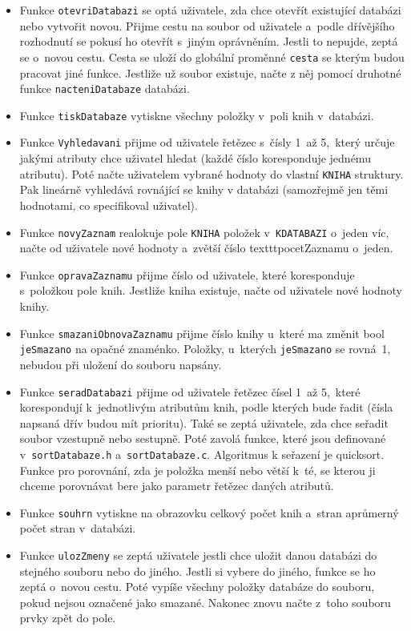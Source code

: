 \begin{itemize}
  \item Funkce \texttt{otevriDatabazi} se optá uživatele, zda chce otevřít existující databázi nebo vytvořit novou. 
  Přijme cestu na soubor od uživatele a~podle dřívějšího rozhodnutí se pokusí ho otevřít s~jiným oprávněním. Jestli 
  to nepujde, zeptá se o~novou cestu. Cesta se uloží do globální proměnné \texttt{cesta} se kterým budou pracovat jiné 
  funkce. Jestliže už soubor existuje, načte z něj pomocí druhotné funkce \texttt{nacteniDatabaze} databázi.
  \item Funkce \texttt{tiskDatabaze} vytiskne všechny položky v~poli knih v~databázi.
  \item Funkce \texttt{Vyhledavani} přijme od uživatele řetězec s~čísly 1~až 5,~který určuje jakými atributy chce
  uživatel hledat (každé číslo koresponduje jednému atributu). Poté načte uživatelem vybrané hodnoty do vlastní
  \texttt{KNIHA} struktury. Pak lineárně vyhledává rovnájící se knihy v databázi (samozřejmě jen těmi hodnotami, co specifikoval 
  uživatel).
  \item Funkce \texttt{novyZaznam} realokuje pole \texttt{KNIHA} položek v~\texttt{KDATABAZI} o~jeden víc, načte od uživatele 
  nové hodnoty a~zvětší číslo texttt{pocetZaznamu} o~jeden.
  \item Funkce \texttt{opravaZaznamu} přijme číslo od uživatele, které koresponduje s~položkou pole knih. Jestliže kniha existuje, 
  načte od uživatele nové hodnoty knihy.
  \item Funkce \texttt{smazaniObnovaZaznamu} přijme číslo knihy u~které ma změnit bool \texttt{jeSmazano} na opačné znaménko. 
  Položky, u~kterých \texttt{jeSmazano} se rovná~1, nebudou při uložení do souboru napsány. 
  \item Funkce \texttt{seradDatabazi} přijme od uživatele řetězec čísel 1~až 5,~které korespondují k~jednotlivým atributům 
    knih, podle kterých bude řadit (čísla napsaná dřív budou mít prioritu). Také se zeptá uživatele, zda chce 
    seřadit soubor vzestupně nebo sestupně. Poté zavolá funkce, které jsou definované 
    v~\texttt{sortDatabaze.h} a~\texttt{sortDatabaze.c}. Algoritmus k seřazení je quicksort. Funkce pro porovnání, zda je 
    položka menší nebo větší k~té, se kterou ji chceme porovnávat bere jako parametr řetězec daných atributů.
  \item Funkce \texttt{souhrn} vytiskne na obrazovku celkový počet knih a~stran aprůmerný počet stran v~databázi.
  \item Funkce \texttt{ulozZmeny} se zeptá uživatele jestli chce uložit danou databázi do stejného souboru nebo do jiného. 
  Jestli si vybere do jiného, funkce se ho zeptá o~novou cestu. Poté vypíše všechny položky databáze do souboru, pokud 
  nejsou označené jako smazané. Nakonec znovu načte z~toho souboru prvky zpět do pole. 
\end{itemize}

